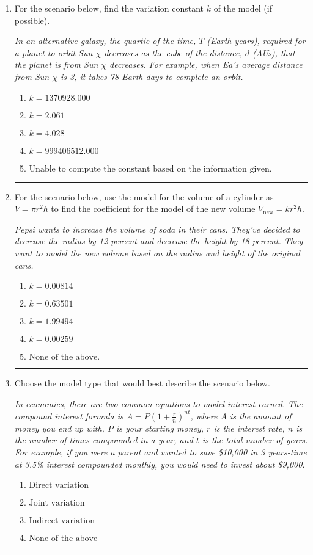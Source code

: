 \documentclass[14pt]{extbook}
\newcommand{\litem}[1]{\item#1\hspace*{-1cm}\rule{\textwidth}{0.4pt}}
\begin{document}
\begin{enumerate}
{\begin{enumerate}[label=\Alph*.]
\end{enumerate} }
\litem{
For the scenario below, find the variation constant $k$ of the model (if possible).
\begin{center}
    \textit{ In an alternative galaxy, the quartic of the time, $T$ (Earth years), required for a planet to orbit Sun $\chi$ decreases as the cube of the distance, $d$ (AUs), that the planet is from Sun $\chi$ decreases. For example, when Ea's average distance from Sun $\chi$ is 3, it takes 78 Earth days to complete an orbit. }
\end{center}
\begin{enumerate}[label=\Alph*.]
\item \( k = 1370928.000 \)
\item \( k = 2.061 \)
\item \( k = 4.028 \)
\item \( k = 999406512.000 \)
\item \( \text{Unable to compute the constant based on the information given.} \)

\end{enumerate} }
\litem{
For the scenario below, use the model for the volume of a cylinder as $V = \pi r^2 h$ to find the coefficient for the model of the new volume $V_{\text{new}} = k r^2 h$.
\begin{center}
    \textit{ Pepsi wants to increase the volume of soda in their cans. They've decided to decrease the radius by 12 percent and decrease the height by 18 percent. They want to model the new volume based on the radius and height of the original cans. }
\end{center}
\begin{enumerate}[label=\Alph*.]
\item \( k = 0.00814 \)
\item \( k = 0.63501 \)
\item \( k = 1.99494 \)
\item \( k = 0.00259 \)
\item \( \text{None of the above.} \)

\end{enumerate} }
\litem{
Choose the model type that would best describe the scenario below.
\begin{center}
    \textit{ In economics, there are two common equations to model interest earned. The compound interest formula is $A = P (1 + \frac{r}{n})^{nt}$, where $A$ is the amount of money you end up with, $P$ is your starting money, $r$ is the interest rate, $n$ is the number of times compounded in a year, and $t$ is the total number of years. For example, if you were a parent and wanted to save \$10,000 in 3 years-time at 3.5\% interest compounded monthly, you would need to invest about \$9,000. }
\end{center}
\begin{enumerate}[label=\Alph*.]
\item \( \text{Direct variation} \)
\item \( \text{Joint variation} \)
\item \( \text{Indirect variation} \)
\item \( \text{None of the above} \)


\end{enumerate}}
\end{enumerate}
\end{document}
